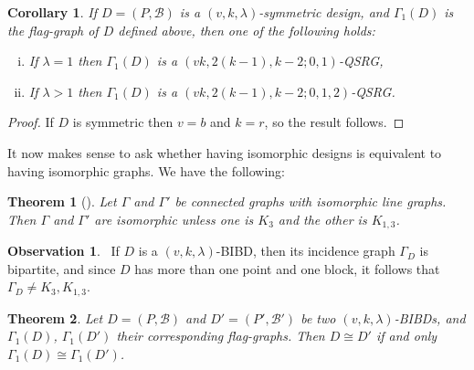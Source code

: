 \documentclass[letterpaper,10pt]{article}
\theoremstyle{plain}
\newtheorem{thm}{Theorem}
\newtheorem{cor}{Corollary}
\theoremstyle{definition}
\newtheorem{ob}{Observation}
\begin{document}
 \begin{cor}
 If $D=(P,\mathcal{B})$ is a $(v,k,\lambda)$-symmetric design, and $\Gamma_1(D)$ is the flag-graph of $D$ defined above, then one of the following holds:
 \begin{enumerate}[(i)]
     \item If $\lambda=1$ then $\Gamma_1(D)$ is a $(vk,2(k-1),k-2;0,1)$-QSRG,
     \item If $\lambda>1$ then $\Gamma_1(D)$ is a $(vk,2(k-1),k-2;0,1,2)$-QSRG.
 \end{enumerate}
 \end{cor}
\begin{proof} 
    If $D$ is symmetric then $v=b$ and $k=r$, so the result follows.
\end{proof}

It now makes sense to ask whether having isomorphic designs is equivalent to having isomorphic graphs. We have the following:

\begin{thm}[\cite{Wh}]%
\label{whit}
Let $\Gamma$ and $\Gamma'$ be connected graphs with isomorphic line graphs. Then $\Gamma$ and $\Gamma'$ are isomorphic unless one is $K_3$ and the other is $K_{1,3}$.
\end{thm}

\begin{ob}~\label{K3}
    If $D$ is a $(v,k,\lambda)$-BIBD, then its incidence graph $\Gamma_D$ is bipartite, and since $D$ has more than one point and one block, it follows that $\Gamma_D\neq K_3,K_{1,3}$.
\end{ob}

\begin{thm}\label{t3}
  Let $D=(P,\mathcal{B})$ and $D'=(P',\mathcal{B}')$ be two $(v,k,\lambda)$-BIBDs, and $\Gamma_1(D)$, $\Gamma_1(D')$ their corresponding flag-graphs. Then $D\cong D'$ if and only $\Gamma_1(D)\cong\Gamma_1(D')$.  
\end{thm}
\end{document}
